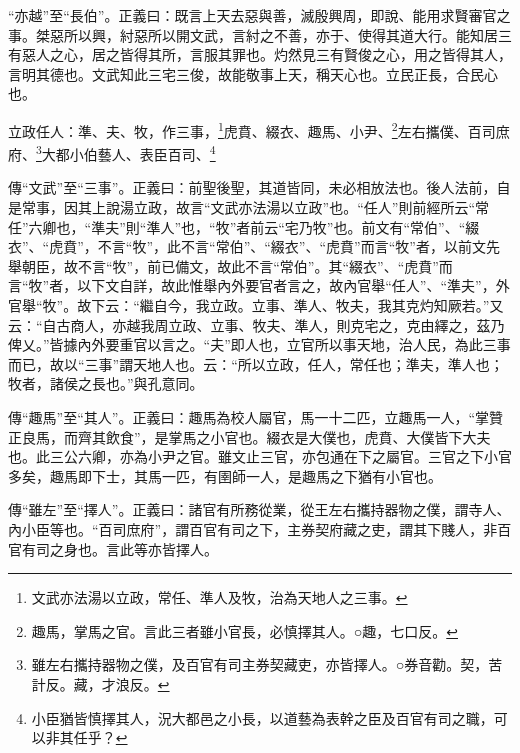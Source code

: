 {\noindent\shu{}\fzkt “亦越”至“長伯”。正義曰：既言上天去惡與善，滅殷興周，即說、能用求賢審官之事。桀惡所以興，紂惡所以開文武，言紂之不善，亦于、使得其道大行。能知居三有惡人之心，居之皆得其所，言服其罪也。灼然見三有賢俊之心，用之皆得其人，言明其德也。文武知此三宅三俊，故能敬事上天，稱天心也。立民正長，合民心也。 \par}

立政任人：準、夫、牧，作三事，\footnote{文武亦法湯以立政，常任、準人及牧，治為天地人之三事。}虎賁、綴衣、趣馬、小尹、\footnote{趣馬，掌馬之官。言此三者雖小官長，必慎擇其人。○趣，七口反。}左右攜僕、百司庶府、\footnote{雖左右攜持器物之僕，及百官有司主券契藏吏，亦皆擇人。○券音勸。契，苦計反。藏，才浪反。}大都小伯藝人、表臣百司、\footnote{小臣猶皆慎擇其人，況大都邑之小長，以道藝為表幹之臣及百官有司之職，可以非其任乎？}


{\noindent\zhuan{}\fzbyks 傳“文武”至“三事”。正義曰：前聖後聖，其道皆同，未必相放法也。後人法前，自是常事，因其上說湯立政，故言“文武亦法湯以立政”也。“任人”則前經所云“常任”六卿也，“準夫”則“準人”也，“牧”者前云“宅乃牧”也。前文有“常伯”、“綴衣”、“虎賁”，不言“牧”，此不言“常伯”、“綴衣”、“虎賁”而言“牧”者，以前文先舉朝臣，故不言“牧”，前已備文，故此不言“常伯”。其“綴衣”、“虎賁”而言“牧”者，以下文自詳，故此惟舉內外要官者言之，故內官舉“任人”、“準夫”，外官舉“牧”。故下云：“繼自今，我立政。立事、準人、牧夫，我其克灼知厥若。”又云：“自古商人，亦越我周立政、立事、牧夫、準人，則克宅之，克由繹之，茲乃俾乂。”皆據內外要重官以言之。“夫”即人也，立官所以事天地，治人民，為此三事而已，故以“三事”謂天地人也。云：“所以立政，任人，常任也；準夫，準人也；牧者，諸侯之長也。”與孔意同。 \par}

{\noindent\zhuan{}\fzbyks 傳“趣馬”至“其人”。正義曰：趣馬為校人屬官，馬一十二匹，立趣馬一人，“掌贊正良馬，而齊其飲食”，是掌馬之小官也。綴衣是大僕也，虎賁、大僕皆下大夫也。此三公六卿，亦為小尹之官。雖文止三官，亦包通在下之屬官。三官之下小官多矣，趣馬即下士，其馬一匹，有圉師一人，是趣馬之下猶有小官也。 \par}

{\noindent\zhuan{}\fzbyks 傳“雖左”至“擇人”。正義曰：諸官有所務從業，從王左右攜持器物之僕，謂寺人、內小臣等也。“百司庶府”，謂百官有司之下，主券契府藏之吏，謂其下賤人，非百官有司之身也。言此等亦皆擇人。 \par}

